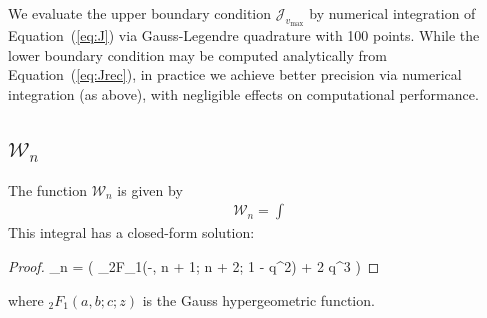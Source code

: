 \documentclass[modern]{aastex62}
\newcommand{\BS}[1]{\ensuremath{\pmb{#1}}}
\newcommand{\STARRYQUADPOINTS}{100\xspace}
\newcommand{\bkappa}{\BS{\kappa}}
\newcommand{\vmax}{{v_\text{max}}}
\begin{document}
We evaluate the upper boundary condition $\mathcal{J}_{\vmax}$ by numerical
integration of Equation~(\ref{eq:J}) via Gauss-Legendre quadrature with
\STARRYQUADPOINTS points. While the lower boundary condition may be computed
analytically from Equation~(\ref{eq:Jrec}),
in practice we achieve better precision via numerical
integration (as above), with negligible effects on computational performance.

\subsection{$\mathcal{W}_n$}
%
The function $\mathcal{W}_n$ is given by
%
\begin{align}
    \label{eq:W}
    \mathcal{W}_n = \int
\end{align}
%
This integral has a closed-form solution:
%
\begin{proof}{}
    \label{eq:Wsol}
    _n =
    \frac{\sin^{2n + 2}\left(\frac{\bkappa}{2}\right)}{2n + 5}
    \left(
        {_2F_1}\left(-, n + 1; n + 2; 1 - q^2\right) + 2 q^3
    \right)
\end{proof}
%
where ${_2F_1}(a, b; c; z)$ is the Gauss hypergeometric function.




\end{document}
